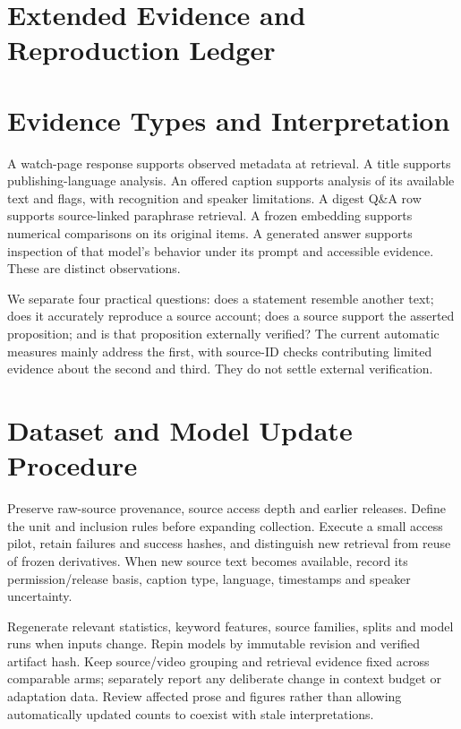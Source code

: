 \section{Extended Evidence and Reproduction Ledger}


\section{Evidence Types and Interpretation}
A watch-page response supports observed metadata at retrieval. A title supports publishing-language analysis. An offered caption supports analysis of its available text and flags, with recognition and speaker limitations. A digest Q\&A row supports source-linked paraphrase retrieval. A frozen embedding supports numerical comparisons on its original items. A generated answer supports inspection of that model's behavior under its prompt and accessible evidence. These are distinct observations.

We separate four practical questions: does a statement resemble another text; does it accurately reproduce a source account; does a source support the asserted proposition; and is that proposition externally verified? The current automatic measures mainly address the first, with source-ID checks contributing limited evidence about the second and third. They do not settle external verification.

\section{Dataset and Model Update Procedure}
Preserve raw-source provenance, source access depth and earlier releases. Define the unit and inclusion rules before expanding collection. Execute a small access pilot, retain failures and success hashes, and distinguish new retrieval from reuse of frozen derivatives. When new source text becomes available, record its permission/release basis, caption type, language, timestamps and speaker uncertainty.

Regenerate relevant statistics, keyword features, source families, splits and model runs when inputs change. Repin models by immutable revision and verified artifact hash. Keep source/video grouping and retrieval evidence fixed across comparable arms; separately report any deliberate change in context budget or adaptation data. Review affected prose and figures rather than allowing automatically updated counts to coexist with stale interpretations.

